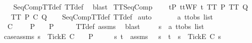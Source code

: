 \begin{isabellebody}
%
\isadelimproof
\ \ %
\endisadelimproof
%
\isatagproof
{}\isamarkupfalse%
\ SeqCompTT{\isacharunderscore}def\ TT{}{\isacharunderscore}def\ \isamarkupfalse%
\ blast%
\endisatagproof
{\isafoldproof}%
%
\isadelimproof
\isanewline
%
\endisadelimproof
\isanewline
{}\isamarkupfalse%
\ TT{}{\isacharunderscore}SeqComp{\isacharcolon}\ \isanewline
\ \ \ {\isachardoublequoteopen}{\isasymforall}t{\isasymin}P{\isachardot}\ ttWF\ t{\isachardoublequoteclose}\ {\isachardoublequoteopen}TT{}\ P{\isachardoublequoteclose}\ {\isachardoublequoteopen}TT{}\ Q{\isachardoublequoteclose}\isanewline
\ \ \ {\isachardoublequoteopen}TT{}\ {\isacharparenleft}P\ {\isacharsemicolon}\isactrlsub C\ Q{\isacharparenright}{\isachardoublequoteclose}\isanewline
%
\isadelimproof
\ \ %
\endisadelimproof
%
\isatagproof
{}\isamarkupfalse%
\ SeqCompTT{\isacharunderscore}def\ TT{}{\isacharunderscore}def\isanewline
{}\isamarkupfalse%
\ {\isacharparenleft}auto{\isacharparenright}\isanewline
\ \ \isamarkupfalse%
\ {\isasymrho}\ {\isasymsigma}\ {\isacharcolon}{\isacharcolon}\ {\isachardoublequoteopen}{\isacharprime}a\ ttobs\ list{\isachardoublequoteclose}\isanewline
\ \ \isamarkupfalse%
\ {\isachardoublequoteopen}{\isasymrho}\ {\isasymlesssim}\isactrlsub C\ {\isasymsigma}\ {\isasymLongrightarrow}\ {\isasymsigma}\ {\isasymin}\ P\ {\isasymLongrightarrow}\ {\isasymrho}\ {\isasymin}\ P{\isachardoublequoteclose}\isanewline
\ \ \ \ \isamarkupfalse%
\ TT{}{\isacharunderscore}def\ assms{\isacharparenleft}{}{\isacharparenright}\ \isamarkupfalse%
\ blast\isanewline
{}\isamarkupfalse%
\isanewline
\ \ \isamarkupfalse%
\ {\isasymsigma}\ s\ {\isacharcolon}{\isacharcolon}\ {\isachardoublequoteopen}{\isacharprime}a\ ttobs\ list{\isachardoublequoteclose}\isanewline
\ \ \isamarkupfalse%
\ case{\isacharunderscore}assms{\isacharcolon}\ {\isachardoublequoteopen}s\ {\isacharat}\ {\isacharbrackleft}{\isacharbrackleft}Tick{\isacharbrackright}\isactrlsub E{\isacharbrackright}\ {\isasymlesssim}\isactrlsub C\ {\isasymsigma}{\isachardoublequoteclose}\ {\isachardoublequoteopen}{\isasymsigma}\ {\isasymin}\ P{\isachardoublequoteclose}\isanewline
\ \ \isamarkupfalse%
\ \isamarkupfalse%
\ s{\isacharprime}\ t\ \ {\isasymsigma}{\isacharunderscore}assms{\isacharcolon}\ {\isachardoublequoteopen}{\isasymsigma}\ {\isacharequal}\ s{\isacharprime}\ {\isacharat}\ t\ {\isasymand}\ s\ {\isacharat}\ {\isacharbrackleft}{\isacharbrackleft}Tick{\isacharbrackright}\isactrlsub E{\isacharbrackright}\ {\isasymsubseteq}\isactrlsub C\ s{\isacharprime}{\isachardoublequoteclose}\isanewline

\end{isabellebody}
